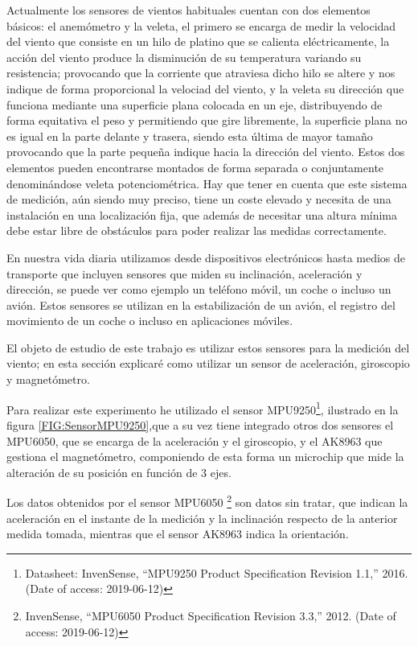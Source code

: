 
 Actualmente los sensores de vientos habituales cuentan con dos elementos básicos: el anemómetro y la veleta, el primero se encarga de medir la velocidad del viento que consiste en un hilo de platino que se calienta eléctricamente, la acción del viento produce la disminución de su temperatura variando su resistencia; provocando que la corriente que atraviesa dicho hilo se altere y nos indique de forma proporcional la velociad del viento\cite{Tropea1995}, y la veleta su dirección que funciona mediante una superficie plana colocada en un eje, distribuyendo de forma equitativa el peso y permitiendo que gire libremente, la superficie plana no es igual en la parte delante y trasera, siendo esta última de mayor tamaño provocando que la parte pequeña indique hacia la dirección del viento\cite{Noble2019}. Estos dos elementos pueden encontrarse montados de forma separada o conjuntamente denominándose veleta potenciométrica\cite{Mur2012}.
 Hay que tener en cuenta que este sistema de medición, aún siendo muy preciso, tiene un coste elevado y necesita de una instalación en una localización fija, que además de necesitar una altura mínima debe estar libre de obstáculos para poder realizar las medidas correctamente.
 
 En nuestra vida diaria utilizamos desde dispositivos electrónicos hasta medios de transporte que incluyen sensores que miden su inclinación, aceleración y dirección, se puede ver como ejemplo un teléfono móvil, un coche o incluso un avión.
 Estos sensores se utilizan en la estabilización de un avión, el registro del movimiento de un coche o incluso en aplicaciones móviles.
 
 El objeto de estudio de este trabajo es utilizar estos sensores para la medición del viento; en esta sección explicaré como utilizar un sensor de aceleración, giroscopio y magnetómetro.
 
 Para realizar este experimento he utilizado el sensor MPU9250\footnote{Datasheet: InvenSense, ``{MPU9250 Product Specification Revision 1.1},'' 2016. (Date of access: 2019-06-12)}, ilustrado en la figura \ref{FIG:SensorMPU9250},que a su vez tiene integrado otros dos sensores el MPU6050, que se encarga de la aceleración y el giroscopio, y el AK8963 que gestiona el magnetómetro, componiendo de esta forma un microchip que mide la alteración de su posición en función de 3 ejes.
 
 Los datos obtenidos por el sensor MPU6050 \footnote{InvenSense, ``{MPU6050 Product Specification Revision 3.3},'' 2012. (Date of access: 2019-06-12)} son datos sin tratar, que indican la aceleración en el instante de la medición y la inclinación respecto de la anterior medida tomada, mientras que el sensor AK8963 indica la orientación.
 
